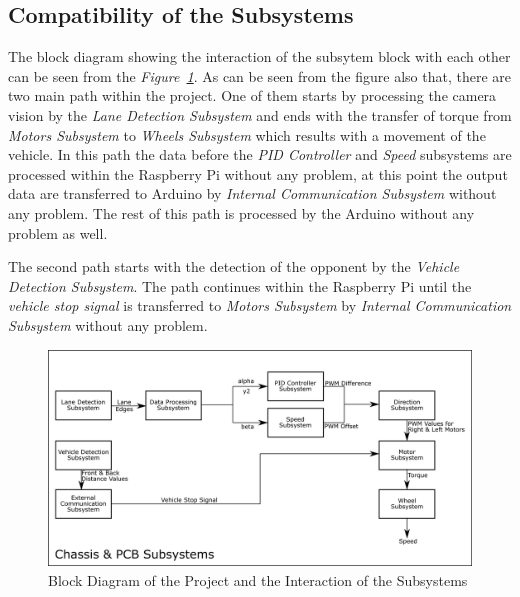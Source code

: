 \documentclass[a4paper,12pt]{article}
\begin{document}
\subsection{Compatibility of the Subsystems}



The block diagram showing the interaction of the subsytem block with each other can be seen from the \textit{Figure~\ref{fig:subsys-block}}. As can be seen from the figure also that, there are two main path within the project. One of them starts by processing the camera vision by the \textit{Lane Detection Subsystem} and ends with the transfer of torque from \textit{Motors Subsystem} to \textit{Wheels Subsystem} which results with a movement of the vehicle. In this path the data before the \textit{PID Controller} and \textit{Speed} subsystems are processed within the Raspberry Pi without any problem, at this point the output data are transferred to Arduino by \textit{Internal Communication Subsystem} without any problem. The rest of this path is processed by the Arduino without any problem as well.


The second path starts with the detection of the opponent by the \textit{Vehicle Detection Subsystem}. The path continues within the Raspberry Pi until the \textit{vehicle stop signal} is transferred to \textit{Motors Subsystem} by \textit{Internal Communication Subsystem} without any problem.



\begin{figure}[h]

\includegraphics[width=\textwidth,center]{images/subsys_block}

\caption{Block Diagram of the Project and the Interaction of the Subsystems}\label{fig:subsys-block}

\end{figure}
\end{document}
